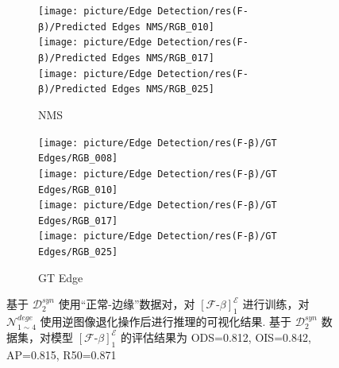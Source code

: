 \documentclass[a4paper]{ctexart}
\begin{document}
\begin{figure}[htbp]
\begin{subfigure}{0.16\textwidth}
				\texttt{[image: picture/Edge Detection/res(F-β)/Predicted Edges NMS/RGB\_010]} \\
				\texttt{[image: picture/Edge Detection/res(F-β)/Predicted Edges NMS/RGB\_017]} \\
				\texttt{[image: picture/Edge Detection/res(F-β)/Predicted Edges NMS/RGB\_025]}
				\caption{NMS}
				\label{fig: NMS}
			\end{subfigure}
			\begin{subfigure}{0.16\textwidth}
				\texttt{[image: picture/Edge Detection/res(F-β)/GT Edges/RGB\_008]} \\
				\texttt{[image: picture/Edge Detection/res(F-β)/GT Edges/RGB\_010]} \\
				\texttt{[image: picture/Edge Detection/res(F-β)/GT Edges/RGB\_017]} \\
				\texttt{[image: picture/Edge Detection/res(F-β)/GT Edges/RGB\_025]}
				\caption{GT Edge}
				\label{fig: GT Edge}
			\end{subfigure}
			
			\caption{基于 $\mathcal{D}^{syn}_{2}$ 使用“正常-边缘”数据对，对 ${\left[\mathcal{F}\text{-}\beta\right]}^{\mathcal{E}}_1$ 进行训练，对 $\mathcal{N}_{1 \sim 4}^{dege}$ 使用逆图像退化操作后进行推理的可视化结果. 基于 $\mathcal{D}^{syn}_{2}$ 数据集，对模型 ${\left[\mathcal{F}\text{-}\beta\right]}^{\mathcal{E}}_1$ 的评估结果为 ODS=0.812, OIS=0.842, AP=0.815, R50=0.871}
		\end{figure}
		
\end{document}
